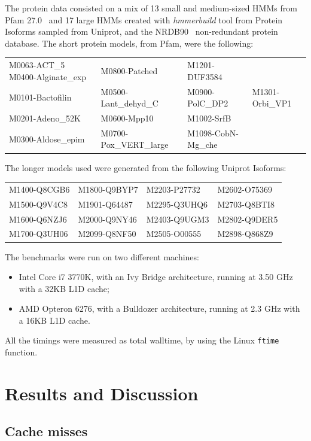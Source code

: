 \documentclass{bmcart}
\begin{document}
The protein data consisted on a mix of 13 small and medium-sized \acp{HMM} from Pfam
27.0~\cite{Pfam} and 17 large \acp{HMM} created with
\textit{hmmerbuild} tool from Protein Isoforms sampled from Uniprot,
and the NRDB90~\cite{nrdb90} non-redundant protein database. The short
protein models, from Pfam, were the following:

\vspace{5px}
\begin{tabular}{llll}
M0063-ACT\_5 M0400-Alginate\_exp & M0800-Patched& M1201-DUF3584 \\
M0101-Bactofilin& M0500-Lant\_dehyd\_C& M0900-PolC\_DP2& M1301-Orbi\_VP1 \\
M0201-Adeno\_52K& M0600-Mpp10& M1002-SrfB \\
M0300-Aldose\_epim& M0700-Pox\_VERT\_large& M1098-CobN-Mg\_che	\\
\end{tabular}
\vspace{1px}

The longer models used were generated from the following Uniprot
Isoforms: 

\vspace{5px}
\begin{tabular}{llll}
M1400-Q8CGB6& M1800-Q9BYP7& M2203-P27732& M2602-O75369 \\
M1500-Q9V4C8& M1901-Q64487& M2295-Q3UHQ6& M2703-Q8BTI8 \\
M1600-Q6NZJ6& M2000-Q9NY46& M2403-Q9UGM3& M2802-Q9DER5 \\
M1700-Q3UH06& M2099-Q8NF50& M2505-O00555& M2898-Q868Z9 
\end{tabular}
\vspace{5px}


The benchmarks were run on two different machines:
\begin{itemize}
\item Intel Core i7 3770K, with an Ivy Bridge architecture, running at 3.50 GHz with a 32KB L1D cache;
\item AMD Opteron 6276, with a Bulldozer architecture, running at 2.3 GHz with a 16KB L1D cache.
\end{itemize}
All the timings were measured as total walltime, by using the Linux \texttt{ftime} function.

\section*{Results and Discussion}

\subsection*{Cache misses}
\end{document}
